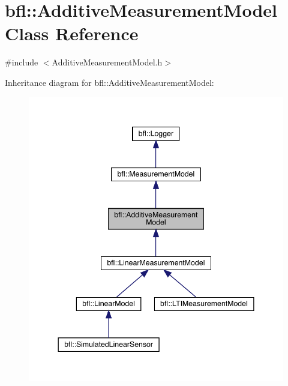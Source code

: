 \hypertarget{classbfl_1_1AdditiveMeasurementModel}{}\section{bfl\+:\+:Additive\+Measurement\+Model Class Reference}
\label{classbfl_1_1AdditiveMeasurementModel}


{\ttfamily \#include $<$Additive\+Measurement\+Model.\+h$>$}



Inheritance diagram for bfl\+:\+:Additive\+Measurement\+Model\+:
\nopagebreak
\begin{figure}[H]
\begin{center}
\leavevmode
\includegraphics[width=344pt]{classbfl_1_1AdditiveMeasurementModel__inherit__graph}
\end{center}
\end{figure}
